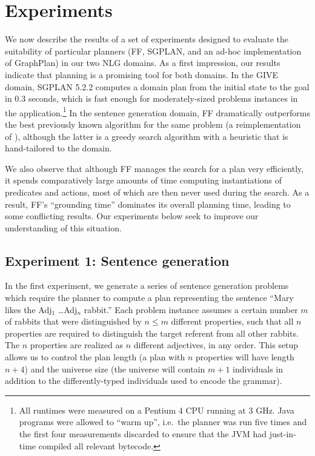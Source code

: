 \section{Experiments} \label{sec:experiments}

We now describe the results of a set of experiments designed to evaluate
the suitability of particular planners (FF, SGPLAN, and an ad-hoc
implementation of GraphPlan) in our two NLG domains. As a first impression,
our results indicate that planning is a promising tool for both domains. In
the GIVE domain, SGPLAN 5.2.2 computes a domain plan from the initial state
to the goal in 0.3 seconds, which is fast enough for moderately-sized
problems instances in the application.\footnote{All runtimes were
  measured on a Pentium 4 CPU running at 3 GHz. Java programs were allowed
  to ``warm up'', i.e.\ the planner was run five times and the first four
  measurements discarded to ensure that the JVM had just-in-time compiled
  all relevant bytecode.}
In the sentence generation domain, FF dramatically outperforms the best
previously known algorithm for the same problem (a reimplementation of
\cite{Stone2003a}), although the latter is a greedy search algorithm with a
heuristic that is hand-tailored to the domain.

We also observe that although FF manages the search for a plan very
efficiently, it spends comparatively large amounts of time computing
instantiations of predicates and actions, most of which are then never used
during the search. As a result, FF's ``grounding time'' dominates its
overall planning time, leading to some conflicting results. Our experiments
below seek to improve our understanding of this situation.


\subsection{Experiment 1: Sentence generation}
\label{sec:exper-1:-sent}

In the first experiment, we generate a series of sentence generation
problems which require the planner to compute a plan representing the
sentence ``Mary likes the Adj$_1$ \ldots Adj$_n$ rabbit.''  Each problem
instance assumes a certain number $m$ of rabbits that were distinguished by
$n \leq m$ different properties, such that all $n$ properties are required
to distinguish the target referent from all other rabbits.  The $n$
properties are realized as $n$ different adjectives, in any order.  This
setup allows us to control the plan length (a plan with $n$ properties will
have length $n+4$) and the universe size (the universe will contain $m+1$
individuals in addition to the differently-typed individuals used to encode
the grammar).

